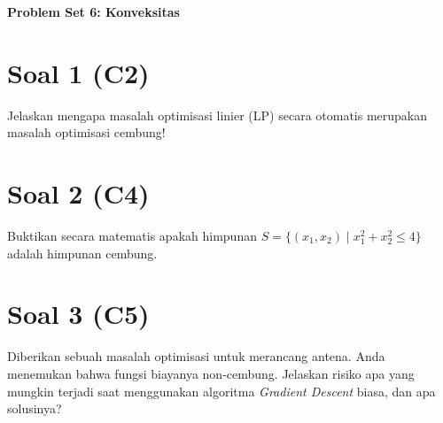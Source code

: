 \documentclass[11pt, a4paper]{article}
\begin{document}
\begin{center}\Large\color{UNIBBlue}\textbf{Problem Set 6: Konveksitas}\end{center}
\section*{Soal 1 (C2)}
Jelaskan mengapa masalah optimisasi linier (LP) secara otomatis merupakan masalah optimisasi cembung!
\section*{Soal 2 (C4)}
Buktikan secara matematis apakah himpunan $S = \{ (x_1, x_2) \mid x_1^2 + x_2^2 \le 4 \}$ adalah himpunan cembung.
\section*{Soal 3 (C5)}
Diberikan sebuah masalah optimisasi untuk merancang antena. Anda menemukan bahwa fungsi biayanya non-cembung. Jelaskan risiko apa yang mungkin terjadi saat menggunakan algoritma \textit{Gradient Descent} biasa, dan apa solusinya?
\end{document}
